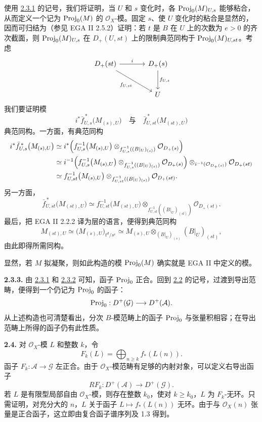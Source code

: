 使用 \hyperlink{sga6.e06.para.2-3-1}{2.3.1} 的记号，我们将证明，当 \(U\) 和 \(s\) 变化时，各 \(\operatorname{Proj}_0(M)_{U,s}\) 能够粘合，从而定义一个记为 \(\operatorname{Proj}_0(M)\) 的 \(\mathcal O_X\)-模。固定 \(s\)、使 \(U\) 变化时的粘合是显然的，因而可归结为（参见 EGA II 2.5.2）证明：若 \(t\) 是 \(B\) 在 \(U\) 上的次数为 \(e>0\) 的齐次截面，则 \(\operatorname{Proj}_0(M)_{U,s}\) 在 \(D_+(U,st)\) 上的限制典范同构于 \(\operatorname{Proj}_0(M)_{U,st}\)。考虑
\[
\begin{tikzcd}[column sep=large,row sep=large]
D_+(st) \arrow[r,"i"] \arrow[dr,"f_{U,st}"'] &
D_+(s) \arrow[d,"f_{U,s}"]\\
& U
\end{tikzcd}
\]
我们要证明模
\[
  i^*\bar f_{U,s}^{\,*}\bigl(M_{(s),U}\bigr)
  \quad\text{与}\quad
  \bar f_{U,st}^{\,*}\bigl(M_{(st),U}\bigr)
\]
典范同构。一方面，有典范同构
\[
\begin{aligned}
i^*\bar f_{U,s}^{\,*}\bigl(M_{(s),U}\bigr)
&\simeq
i^*\Bigl(f_{U,s}^{-1}\bigl(M_{(s),U}\bigr)
 \otimes_{f_{U,s}^{-1}((B|_U)_{(s)})}\mathcal O_{D_+(s)}\Bigr)\\
&\simeq
i^{-1}\Bigl(f_{U,s}^{-1}\bigl(M_{(s),U}\bigr)
 \otimes_{f_{U,s}^{-1}((B|_U)_{(s)})}\mathcal O_{D_+(s)}\Bigr)
 \otimes_{i^{-1}(\mathcal O_{D_+(s)})}\mathcal O_{D_+(st)}\\
&\simeq
f_{U,st}^{-1}\bigl(M_{(s),U}\bigr)
 \otimes_{f_{U,st}^{-1}((B|_U)_{(s)})}\mathcal O_{D_+(st)} .
\end{aligned}
\]
另一方面，
\[
  \bar f_{U,st}^{\,*}\bigl(M_{(st),U}\bigr)
  \simeq
  f_{U,st}^{-1}\bigl(M_{(st),U}\bigr)
  \otimes_{f_{U,st}^{-1}((B|_U)_{(st)})}\mathcal O_{D_+(st)} .
\]
最后，把 EGA II 2.2.2 译为层的语言，便得到典范同构
\[
  M_{(st),U}\simeq
  \bigl(M_{(s),U}\bigr)_{t^d/s^e}
  \simeq
  M_{(s),U}\otimes_{(B|_U)_{(s)}}(B|_U)_{(st)},
\]
由此即得所需同构。

显然，若 \(M\) 拟凝聚，则如此构造的模 \(\operatorname{Proj}_0(M)\) 确实就是 EGA II 中定义的模。

\textbf{2.3.3.} 由 \hyperlink{sga6.e06.para.2-3-1}{2.3.1} 和 \hyperlink{sga6.e06.para.2-3-2}{2.3.2} 可知，函子 \(\operatorname{Proj}_0\) 正合。回到 \hyperlink{sga6.e06.sec.2.2}{2.2} 的记号，过渡到导出范畴，便得到一个仍记为 \(\operatorname{Proj}_0\) 的函子：
\[
  \operatorname{Proj}_0:D^+(\mathcal G)\longrightarrow D^+(\mathcal A).
\]
从上述构造也可清楚看出，分次 \(B\)-模范畴上的函子 \(\operatorname{Proj}_0\) 与张量积相容；在导出范畴上所得的函子仍有此性质。

\noindent\textbf{2.4.}
对 \(\mathcal O_X\)-模 \(L\) 和整数 \(k\)，令
\begin{equation}\tag{2.4.1}
  F_k(L)=\bigoplus_{n\geq k} f_*(L(n)).
\end{equation}
函子 \(F_k:\mathcal A\to\mathcal G\) 左正合。由于 \(\mathcal O_X\)-模范畴有足够的内射对象，可以定义右导出函子
\begin{equation}\tag{2.4.2}
  RF_k:D^+(\mathcal A)\longrightarrow D^+(\mathcal G).
\end{equation}
若 \(L\) 是有限型局部自由 \(\mathcal O_X\)-模，则存在整数 \(k_0\)，使对 \(k\geq k_0\)，\(L\) 为 \(F_k\)-无环。只需证明，对充分大的 \(n\)，\(L\) 关于函子 \(L\mapsto f_*(L(n))\) 无环。由于与 \(\mathcal O_X(n)\) 张量是正合函子，这立即由复合函子谱序列及 1.3 得到。

